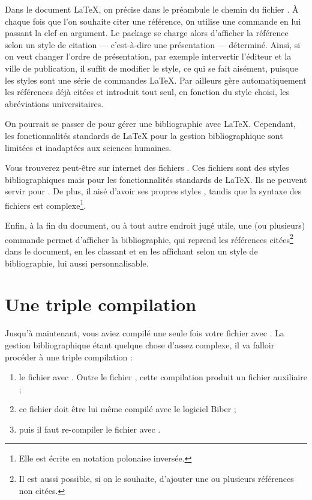 Dans le document \LaTeX{}, on précise dans le préambule le chemin du fichier . À chaque fois que l'on souhaite citer une référence, οn utilise une commande en lui passant la clef en argument. Le package  se charge alors d'afficher la référence selon un style de citation --- c’est-à-dire une présentation --- déterminé. Ainsi, si on veut changer l'ordre de présentation, par exemple intervertir l'éditeur et la ville de publication, il suffit de modifier le style, ce qui se fait aisément, puisque les styles sont une série de commandes \LaTeX{}. Par ailleurs  gère automatiquement les références déjà citées et introduit tout seul, en fonction du style choisi, les abréviations universitaires. 

\begin{plusloins}
On pourrait se passer de   pour gérer une bibliographie avec \LaTeX{}. Cependant, les fonctionnalités standards de \LaTeX{} pour la gestion bibliographique sont limitées et inadaptées aux sciences humaines. 

Vous trouverez peut-être sur internet des fichiers . Ces fichiers sont des styles bibliographiques mais pour les fonctionnalités standards de \LaTeX{}. Ils ne peuvent servir pour . De plus, il aisé d'avoir ses propres styles , tandis que la syntaxe des fichiers  est complexe\footnote{Elle est écrite en notation polonaise inversée.}.
\end{plusloins}

Enfin, à la fin du document, ou à tout autre endroit jugé utile, une (ou plusieurs) commande permet d'afficher la bibliographie, qui reprend les références citées\footnote{Il est aussi possible, si on le souhaite, d'ajouter une ou plusieurs références non citées.} dans le document, en les classant et en les affichant selon un style de bibliographie, lui aussi personnalisable.

\section{Une triple compilation}\label{3compil}

Jusqu'à maintenant, vous aviez compilé une seule fois votre fichier  avec \XeLaTeX. La gestion bibliographique étant quelque chose d'assez complexe, il va falloir procéder à une triple compilation :
\begin{enumerate}
\item le fichier  avec \XeLaTeX. Outre le fichier , cette compilation produit un fichier auxiliaire  ;
\item ce fichier doit être lui même compilé avec le logiciel Biber ;
\item puis il faut re-compiler le fichier  avec \XeLaTeX.
\end{enumerate}


